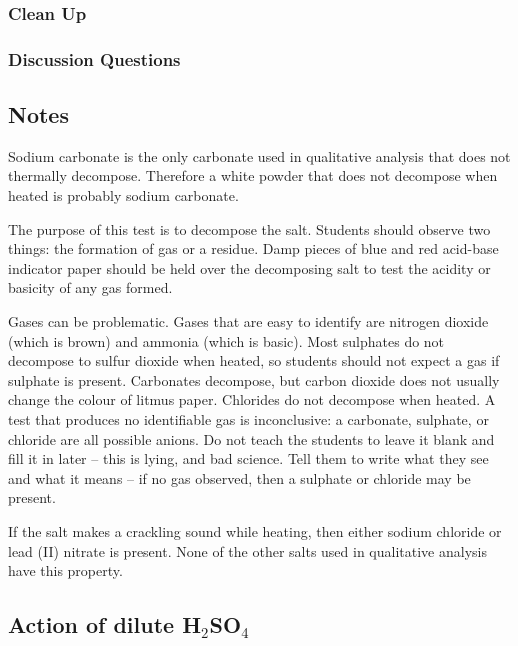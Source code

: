 \subsubsection{Clean Up}
\begin{enumerate}
\end{enumerate}


\subsubsection{Discussion Questions}
\begin{enumerate}
\end{enumerate}

\subsection{Notes}
Sodium carbonate is the only carbonate used in qualitative analysis that does not thermally decompose. Therefore a white powder that does not decompose when heated is probably sodium carbonate.

The purpose of this test is to decompose the salt. 
Students should observe two things: the formation of gas or a residue. 
Damp pieces of blue and red acid-base indicator paper should be held 
over the decomposing salt to test the acidity or basicity of any gas formed.

Gases can be problematic. 
Gases that are easy to identify are nitrogen dioxide 
(which is brown) and ammonia (which is basic). 
Most sulphates do not decompose to sulfur dioxide when heated, 
so students should not expect a gas if sulphate is present. 
Carbonates decompose, 
but carbon dioxide does not usually change the colour of litmus paper. 
Chlorides do not decompose when heated. 
A test that produces no identifiable gas is inconclusive: a carbonate, 
sulphate, 
or chloride are all possible anions. 
Do not teach the students to leave it blank and fill it in later – 
this is lying, 
and bad science. 
Tell them to write what they see and what it means – if no gas observed, 
then a sulphate or chloride may be present.

If the salt makes a crackling sound while heating, 
then either sodium chloride or lead (II) nitrate is present. 
None of the other salts used in qualitative analysis have this property.


\subsection{Action of dilute H$_{2}$SO$_{4}$}

